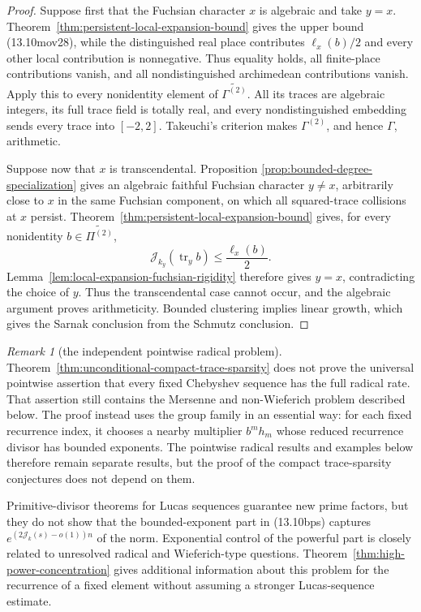 \documentclass[11pt,reqno]{amsart}
\theoremstyle{definition}
\theoremstyle{remark}
\newtheorem{remark}[theorem]{Remark}
\newcommand{\Tr}{\operatorname{tr}}
\begin{document}
\begin{proof}
Suppose first that the Fuchsian character \(x\) is algebraic and take
\(y=x\).  Theorem~\ref{thm:persistent-local-expansion-bound} gives the
upper bound (13.10mov28), while the distinguished real place contributes
\(\ell_x(b)/2\) and every other local contribution is nonnegative.  Thus
equality holds, all finite-place
contributions vanish, and all nondistinguished archimedean contributions
vanish.  Apply this to every nonidentity element of
\(\widetilde{\Gamma^{(2)}}\).  All its traces are algebraic integers, its
full trace field is totally real, and every nondistinguished embedding
sends every trace into \([-2,2]\).  Takeuchi's criterion \cite{Takeuchi} makes
\(\Gamma^{(2)}\), and hence \(\Gamma\), arithmetic.

Suppose now that \(x\) is transcendental.  Proposition
\ref{prop:bounded-degree-specialization} gives an algebraic faithful
Fuchsian character \(y\ne x\), arbitrarily close to \(x\) in the same
Fuchsian component, on which all squared-trace collisions at \(x\)
persist.  Theorem~\ref{thm:persistent-local-expansion-bound} gives, for
every nonidentity \(b\in\widetilde{\Pi^{(2)}}\),
\[
 \mathcal J_{k_y}(\Tr_yb)\le\frac{\ell_x(b)}2.
\tag{13.10mov30}
\]
Lemma~\ref{lem:local-expansion-fuchsian-rigidity} therefore gives \(y=x\),
contradicting the choice of \(y\).  Thus the transcendental case cannot
occur, and the algebraic argument proves arithmeticity.  Bounded clustering
implies linear growth, which gives the Sarnak conclusion from the Schmutz
conclusion.
\end{proof}

\begin{remark}[the independent pointwise radical problem]
\label{rem:pointwise-radical-still-open}
Theorem~\ref{thm:unconditional-compact-trace-sparsity} does not prove the
universal pointwise assertion that every fixed Chebyshev sequence has the
full radical rate.  That assertion still contains the Mersenne and
non-Wieferich problem described below.  The proof instead uses the group
family in an essential way: for each fixed recurrence index, it chooses a
nearby multiplier \(b^mh_m\) whose reduced recurrence divisor has bounded
exponents.  The pointwise radical results and examples below therefore
remain separate results, but the proof of the compact trace-sparsity
conjectures does not depend on them.
\end{remark}

Primitive-divisor theorems for Lucas sequences guarantee new prime factors,
but they do not show that the bounded-exponent part in (13.10bps) captures
\(e^{(2\mathcal J_k(s)-o(1))n}\) of the norm.  Exponential control of the
powerful part is closely related to unresolved radical and Wieferich-type
questions.  Theorem~\ref{thm:high-power-concentration} gives additional
information about this problem for the recurrence of a fixed element without
assuming a stronger Lucas-sequence estimate.
\end{document}
